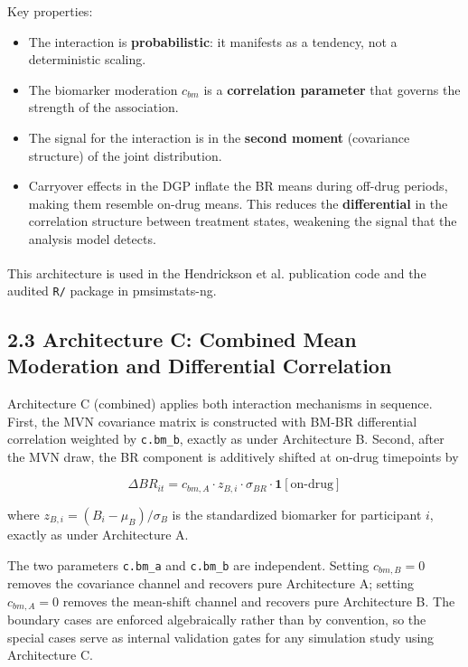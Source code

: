 \documentclass[
  11pt,
]{article}
\begin{document}
Key properties:

\begin{itemize}
\item The interaction is \textbf{probabilistic}: it manifests as a
  tendency, not a deterministic scaling.
\item The biomarker moderation $c_{bm}$ is a \textbf{correlation
  parameter} that governs the strength of the association.
\item The signal for the interaction is in the \textbf{second moment}
  (covariance structure) of the joint distribution.
\item Carryover effects in the DGP inflate the BR means during
  off-drug periods, making them resemble on-drug means. This
  reduces the \textbf{differential} in the correlation structure
  between treatment states, weakening the signal that the
  analysis model detects.
\end{itemize}

This architecture is used in the Hendrickson et
al.\textsuperscript{} publication code
and the audited \texttt{R/} package in pmsimstats-ng.

\subsection{2.3 Architecture C: Combined Mean Moderation and
Differential Correlation}

Architecture C (combined) applies both interaction mechanisms in
sequence. First, the MVN covariance matrix is constructed with BM-BR
differential correlation weighted by \texttt{c.bm\_b}, exactly as under
Architecture B. Second, after the MVN draw, the BR component is
additively shifted at on-drug timepoints by

\[
\Delta BR_{it} = c_{bm,A} \cdot z_{B,i} \cdot \sigma_{BR}
  \cdot \mathbf{1}[\text{on-drug}]
\]

where \(z_{B,i} = (B_i - \mu_B)/\sigma_B\) is the standardized biomarker
for participant \(i\), exactly as under Architecture A.

The two parameters \texttt{c.bm\_a} and \texttt{c.bm\_b} are
independent. Setting \(c_{bm,B} = 0\) removes the covariance channel and
recovers pure Architecture A; setting \(c_{bm,A} = 0\) removes the
mean-shift channel and recovers pure Architecture B. The boundary cases
are enforced algebraically rather than by convention, so the special
cases serve as internal validation gates for any simulation study using
Architecture C.
\end{document}

